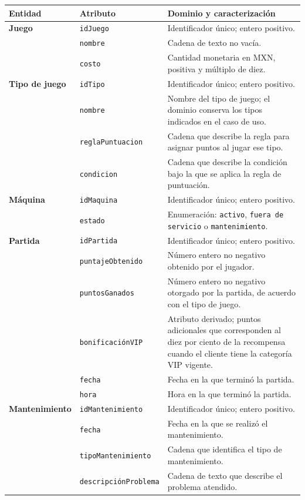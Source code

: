\begin{center}
\small
\begin{tabularx}{\textwidth}{@{}>{\bfseries\color{unamblue}}p{}p{}X@{}}
\toprule
Entidad & Atributo & Dominio y caracterización \\
\midrule
Juego & \texttt{idJuego} & Identificador único; entero positivo. \\
 & \texttt{nombre} & Cadena de texto no vacía. \\
 & \texttt{costo} & Cantidad monetaria en MXN, positiva y múltiplo de diez. \\
\midrule
Tipo de juego & \texttt{idTipo} & Identificador único; entero positivo. \\
 & \texttt{nombre} & Nombre del tipo de juego; el dominio conserva los tipos
   indicados en el caso de uso. \\
 & \texttt{reglaPuntuacion} & Cadena que describe la regla para asignar puntos
   al jugar ese tipo. \\
 & \texttt{condicion} & Cadena que describe la condición bajo la que se aplica
   la regla de puntuación. \\
\midrule
Máquina & \texttt{idMaquina} & Identificador único; entero positivo. \\
 & \texttt{estado} & Enumeración: \texttt{activo}, \texttt{fuera de servicio}
   o \texttt{mantenimiento}. \\
\midrule
Partida & \texttt{idPartida} & Identificador único; entero positivo. \\
 & \texttt{puntajeObtenido} & Número entero no negativo obtenido por el
   jugador. \\
 & \texttt{puntosGanados} & Número entero no negativo otorgado por la partida,
   de acuerdo con el tipo de juego. \\
 & \texttt{bonificaciónVIP} & Atributo derivado; puntos adicionales que
   corresponden al diez por ciento de la recompensa cuando el cliente tiene la
   categoría VIP vigente. \\
 & \texttt{fecha} & Fecha en la que terminó la partida. \\
 & \texttt{hora} & Hora en la que terminó la partida. \\
\midrule
Mantenimiento & \texttt{idMantenimiento} & Identificador único; entero positivo. \\
 & \texttt{fecha} & Fecha en la que se realizó el mantenimiento. \\
 & \texttt{tipoMantenimiento} & Cadena que identifica el tipo de mantenimiento. \\
 & \texttt{descripciónProblema} & Cadena de texto que describe el problema
   atendido. \\
\bottomrule
\end{tabularx}
\end{center}

